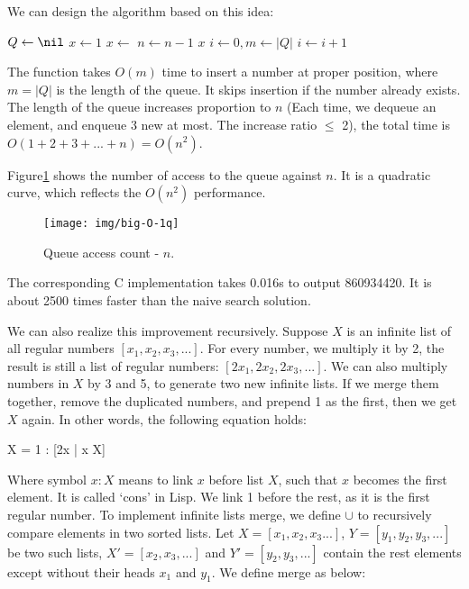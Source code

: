 \documentclass[b5paper]{article}
\begin{document}
We can design the algorithm based on this idea:

\begin{algorithmic}[1]
  \State $Q \gets \nil$
  \State $x \gets 1$
  \State {}
    \State $x \gets$ 
    \State {}
    \State {}
    \State {}
    \State $n \gets n-1$
  \EndWhile
  \State \Return $x$
\EndFunction
\Statex
{}
  \State $i \gets 0, m \gets |Q|$
    \State $i \gets i + 1$
  \EndWhile
    \State {}
  \EndIf
\EndFunction
\end{algorithmic}

The  function takes $O(m)$ time to insert a number at proper position, where $m = |Q|$ is the length of the queue. It skips insertion if the number already exists. The length of the queue increases proportion to $n$ (Each time, we dequeue an element, and enqueue 3 new at most. The increase ratio $\leq$ 2), the total time is $O(1 + 2 + 3 + ... + n) = O(n^2)$.

Figure\ref{fig:big-O-1q} shows the number of access to the queue against $n$. It is a quadratic curve, which reflects the $O(n^2)$ performance.

\begin{figure}[htbp]
  \centering
  \texttt{[image: img/big-O-1q]}
  \caption{Queue access count - $n$.} \label{fig:big-O-1q}
\end{figure}

The corresponding C implementation takes 0.016s to output 860934420. It is about 2500 times faster than the naive search solution.

We can also realize this improvement recursively. Suppose $X$ is an infinite list of all regular numbers $[x_1, x_2, x_3, ...]$. For every number, we multiply it by 2, the result is still a list of regular numbers: $[2x_1, 2x_2, 2x_3, ...]$. We can also multiply numbers in $X$ by 3 and 5, to generate two new infinite lists. If we merge them together, remove the duplicated numbers, and prepend 1 as the first, then we get $X$ again. In other words, the following equation holds:

\be
  X = 1 : [2x | \forall x \in X]\cup [3x | \forall x \in X] \cup [5x | \forall x \in X]
\ee

Where symbol $x : X$ means to link $x$ before list $X$, such that $x$ becomes the first element. It is called `cons' in Lisp. We link 1 before the rest, as it is the first regular number. To implement infinite lists merge, we define $\cup$ to recursively compare elements in two sorted lists. Let $X=[x_1, x_2, x_3...]$, $Y=[y_1, y_2, y_3, ...]$ be two such lists, $X' = [x_2, x_3, ...]$ and $Y'=[y_2, y_3, ...]$ contain the rest elements except without their heads $x_1$ and $y_1$. We define merge as below:
\end{document}
